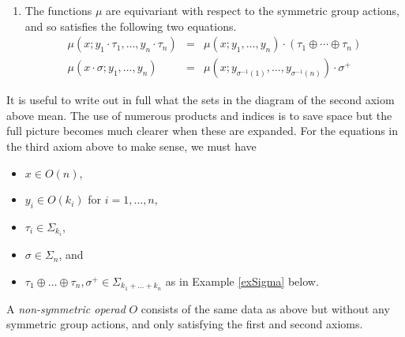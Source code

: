 \documentclass{amsbook} %
\numberwithin{section}{chapter}
\begin{document}
\begin{Defi}
\begin{enumerate}
\[
  \xy
    (0,0)*+{\scriptstyle O(n) \times \left(\prod_{i=1}^n O(k_i)\right) \times \left(\prod_{i=1}^n\prod_{j=1}^{k_i} O(l_{i,j})\right)}="a";
    (65,0)*+{\scriptstyle O(n) \times \prod_{i=1}^n \left(O(k_i) \times \prod_{j=1}^{k_i} O(l_{i,j})\right)}="b";
    (65,-20)*+{\scriptstyle O(n) \times \prod_{i=1}^n O\left(\sum_{j=1}^{k_i} l_{i,j}\right)}="c";
    (65,-40)*+{\scriptstyle O\left(\sum_{i=1}^n \sum_{j=1}^{k_i} l_{i,j}\right)}="d";
    (0,-40)*+{\scriptstyle O\left(\sum_{i=1}^n k_i\right) \times \prod_{i=1}^n \prod_{j=1}^{k_i} O(l_{i,j})}="e";
    {\ar^{\cong} "a" ; "b"};
    {\ar^{1 \times \prod \mu} "b" ; "c"};
    {\ar^{\mu} "c" ; "d"};
    {\ar_{\mu \times 1} "a" ; "e"};
    {\ar_{\mu} "e" ; "d"};
  \endxy
\]
\item The functions $\mu$ are equivariant with respect to the symmetric group actions, and so satisfies the following two equations.
\[
\begin{array}{rcl}
\mu(x; y_{1} \cdot \tau_{1}, \ldots, y_{n} \cdot \tau_{n}) & = & \mu(x; y_{1}, \ldots, y_{n}) \cdot (\tau_{1} \oplus \cdots \oplus \tau_{n}) \\
\mu(x \cdot \sigma; y_{1}, \ldots, y_{n}) & =  & \mu(x; y_{\sigma^{-1}(1)}, \ldots, y_{\sigma^{-1}(n)}) \cdot \sigma^{+}
\end{array}
\]
\end{enumerate}
\end{Defi}

\begin{rem}
It is useful to write out in full what the sets in the diagram of the second axiom above mean. The use of numerous products and indices is to save space but the full picture becomes much clearer when these are expanded. For the equations in the third axiom above to make sense, we must have
\begin{itemize}
\item $x \in O(n)$,
\item $y_{i} \in O(k_{i})$ for $i=1, \ldots, n$,
\item $\tau_{i} \in \Sigma_{k_{i}}$,
\item $\sigma \in \Sigma_{n}$, and
\item $\tau_1 \oplus \ldots \oplus \tau_n , \sigma^{+} \in \Sigma_{k_1 + \ldots + k_n}$ as in Example \ref{exSigma} below.
\end{itemize}

\end{rem}
\begin{Defi}
A \emph{non-symmetric operad} $O$ consists of the same data as above but without any symmetric group actions, and only satisfying the first and second axioms.
\end{Defi}
\end{document}
